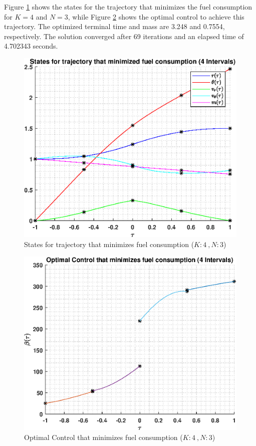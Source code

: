\documentclass[]{article}
\begin{document}
\vspace{2mm}\newline 
Figure \ref{fig:directStatesK4Poly3} shows the states for the trajectory that minimizes the fuel consumption for \(K = 4\) and  \(N = 3\), while Figure \ref{fig:directControlK4Poly3} shows the optimal control to achieve this trajectory. The optimized terminal time and mass are 3.248 and 0.7554, respectively. The solution converged after 69 iterations and an elapsed time of 4.702343 seconds.
\begin{figure}
	\centering
	\includegraphics[scale=0.75]{directStatesK4Poly3.eps}
	\caption{States for trajectory that minimizes fuel consumption (\(K:4\ , N:3\))}
	\label{fig:directStatesK4Poly3}
\end{figure}
\begin{figure}
	\centering
	\includegraphics[scale=0.75]{directControlK4Poly3.eps}
	\caption{Optimal Control that minimizes fuel consumption (\(K:4\ , N:3\))}
	\label{fig:directControlK4Poly3}
\end{figure}
\end{document}
